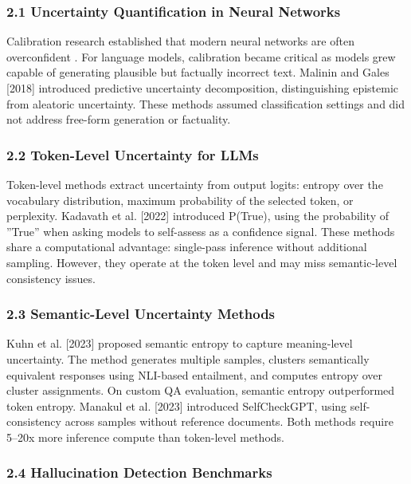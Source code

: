 
\subsubsection{2.1 Uncertainty Quantification in Neural Networks}

Calibration research established that modern neural networks are often overconfident \citep{guo2017calibration}. For language models, calibration became critical as models grew capable of generating plausible but factually incorrect text. Malinin and Gales [2018] introduced predictive uncertainty decomposition, distinguishing epistemic from aleatoric uncertainty. These methods assumed classification settings and did not address free-form generation or factuality.

\subsubsection{2.2 Token-Level Uncertainty for LLMs}

Token-level methods extract uncertainty from output logits: entropy over the vocabulary distribution, maximum probability of the selected token, or perplexity. Kadavath et al. [2022] introduced P(True), using the probability of ''True'' when asking models to self-assess as a confidence signal. These methods share a computational advantage: single-pass inference without additional sampling. However, they operate at the token level and may miss semantic-level consistency issues.

\subsubsection{2.3 Semantic-Level Uncertainty Methods}

Kuhn et al. [2023] proposed semantic entropy to capture meaning-level uncertainty. The method generates multiple samples, clusters semantically equivalent responses using NLI-based entailment, and computes entropy over cluster assignments. On custom QA evaluation, semantic entropy outperformed token entropy. Manakul et al. [2023] introduced SelfCheckGPT, using self-consistency across samples without reference documents. Both methods require 5--20x more inference compute than token-level methods.

\subsubsection{2.4 Hallucination Detection Benchmarks}

